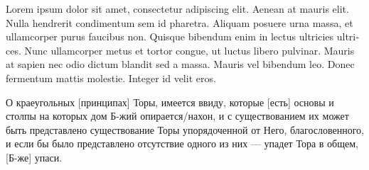 \documentclass{book}
\begin{document}
\numberlinefalse
\numberpstarttrue 
\sidepstartnumtrue 
\beforeeledchapter

\begin{pairs}

\begin{Rightside} %

\begin{latin}%
\beginnumbering%
\pstart
{}
\pend
\pstart
Lorem ipsum dolor sit amet, consectetur adipiscing elit. Aenean at mauris elit. Nulla hendrerit condimentum sem id pharetra. Aliquam posuere urna massa, et ullamcorper purus faucibus non. Quisque bibendum enim in lectus ultricies ultrices. Nunc ullamcorper metus et tortor congue, ut luctus libero pulvinar. Mauris at sapien nec odio dictum blandit sed a massa. Mauris vel bibendum leo. Donec fermentum mattis molestie. Integer id velit eros.

\pend    
\endnumbering%
\end{latin}%


\end{Rightside}%



\begin{russian}%
\begin{Leftside} %
\beginnumbering%
\pstart
{}   
\pend 
\pstart
О краеугольных [принципах] Торы, имеется ввиду, которые [есть] основы и столпы на которых дом Б-жий опирается/нахон, и с существованием их может быть представлено существование Торы упорядоченной от Него, благословенного, и если бы было представлено отсутствие одного из них — упадет Тора в общем, [Б-же] упаси.
\pend
\endnumbering%
\end{Leftside}%
\end{russian}%



\Columns
\end{pairs}
\end{document}
